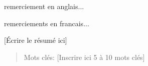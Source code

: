 

\Pagetitre
\cleardoublepage

  
       



\remerciements


remerciement en anglais...


remerciements en francais...




\resume
\begin{singlespace}    

  [Écrire le résumé ici]
  
  \begin{quote} 
    Mots clés: [Inscrire ici 5 à 10 mots clés]
  \end{quote}
\end{singlespace}
\cleardoublepage

